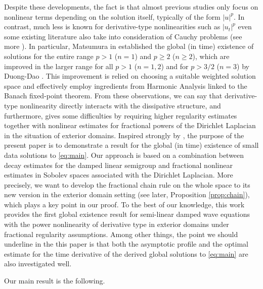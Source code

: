 \documentclass[a4paper,11pt]{article} %
\theoremstyle{remark}
\theoremstyle{definition}
\numberwithin{equation}{section}
\begin{document}
Despite these developments, the fact is that almost previous studies only focus on nonlinear terms depending on the solution itself, typically of the form $|u|^p$. In contrast, much less is known for derivative-type nonlinearities such as $|u_t|^p$ even some existing literature also take into consideration of Cauchy problems (see more \cite{Matsumura1976,DuongDao}). In particular, Matsumura in \cite{Matsumura1976} established the global (in time) existence of solutions for the entire range $p > 1$ ($n = 1$) and $p \ge 2$ ($n \ge 2$), which are improved in the larger range for all $p > 1$ ($n = 1,2$) and for $p > 3/2$ ($n = 3$) by Duong-Dao \cite{DuongDao}. This improvement is relied on choosing a suitable weighted solution space and effectively employ ingredients from Harmonic Analysis linked to the Banach fixed-point theorem. From these observations, we can say that derivative-type nonlinearity directly interacts with the dissipative structure, and furthermore, gives some difficulties by requiring higher regularity estimates together with nonlinear estimates for fractional powers of the Dirichlet Laplacian in the situation of exterior domains. Inspired strongly by \cite{DuongDao}, the purpose of the present paper is to demonstrate a result for the global (in time) existence of small data solutions to \eqref{eq:main}. Our approach is based on a combination between decay estimates for the damped linear semigroup and fractional nonlinear estimates in Sobolev spaces associated with the Dirichlet Laplacian. More precisely, we want to develop the fractional chain rule on the whole space to its new version in the exterior domain setting (see later, Proposition \ref{prop:chain}), which plays a key point in our proof. To the best of our knowledge, this work provides the first global existence result for semi-linear damped wave equations with the power nonlinearity of derivative type in exterior domains under fractional regularity assumptions. Among other things, the point we should underline in the this paper is that both the asymptotic profile and the optimal estimate for the time derivative of the derived global solutions to \eqref{eq:main} are also investigated well. 

Our main result is the following.
\end{document}
